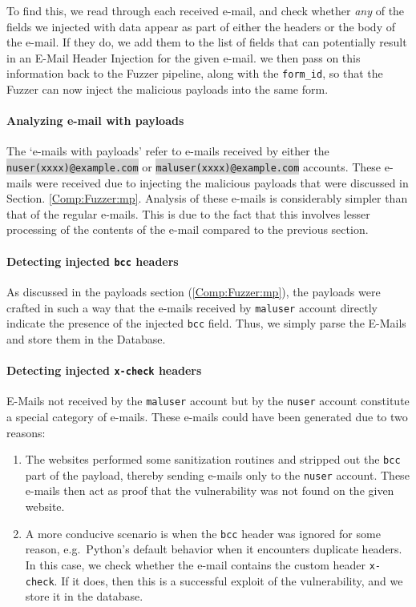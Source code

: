 To find this, we read through each received e-mail, and check whether \emph{any} of the fields we injected with data appear as part of either the headers or the body of the e-mail. If they do, we add them to the list of fields that can potentially result in an E-Mail Header Injection for the given e-mail. we then pass on this information back to the Fuzzer pipeline, along with the \texttt{form\_id}, so that the Fuzzer can now inject the malicious payloads into the same form.

\paragraph{Analyzing e-mail with payloads}
The `e-mails with payloads' refer to e-mails received by either the \colorbox{lightgray}{\lstinline{nuser(xxxx)@example.com}} or \colorbox{lightgray}{\lstinline{maluser(xxxx)@example.com}} accounts. These e-mails were received due to injecting the malicious payloads that were discussed in Section. \ref{Comp:Fuzzer:mp}. Analysis of these e-mails is considerably simpler than that of the regular e-mails. This is due to the fact that this involves lesser processing of the contents of the e-mail compared to the previous section.
\paragraph{Detecting injected \texttt{bcc} headers}
As discussed in the payloads section (\ref{Comp:Fuzzer:mp}), the payloads were crafted in such a way that the e-mails received by \texttt{maluser} account directly indicate the presence of the injected \texttt{bcc} field. Thus, we simply parse the E-Mails and store them in the Database.

\label{analyze:detect_x_check}
\paragraph{Detecting injected \texttt{x-check} headers}
E-Mails not received by the \texttt{maluser} account but by the \texttt{nuser} account constitute a special category of e-mails.
These e-mails could have been generated due to two reasons:
\begin{enumerate}
	\item The websites performed some sanitization routines and stripped out the \texttt{bcc} part of the payload, thereby sending e-mails only to the \texttt{nuser} account. These e-mails then act as proof that the vulnerability was not found on the given website.
	\item A more conducive scenario is when the \texttt{bcc} header was ignored for some reason, e.g.\ Python's default behavior when it encounters duplicate headers. In this case, we check whether the e-mail contains the custom header \texttt{x-check}. If it does, then this is a successful exploit of the vulnerability, and we store it in the database.
\end{enumerate}